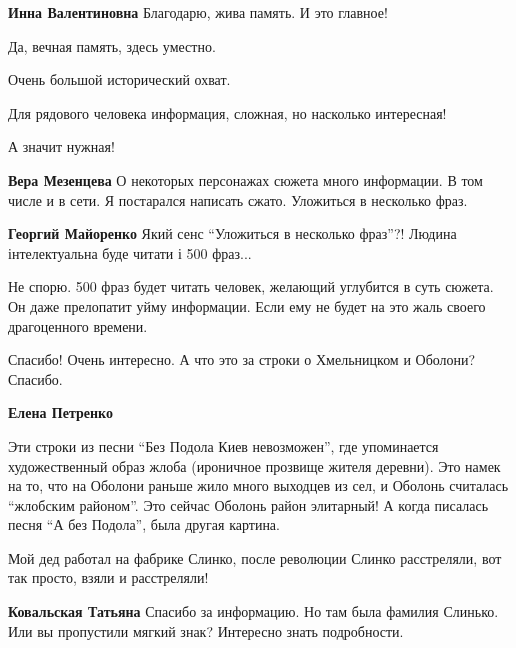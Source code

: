 \begin{itemize}
\textbf{Инна Валентиновна} Благодарю, жива память. И это главное!


Да, вечная память, здесь уместно.

Очень большой исторический охват.

Для рядового человека информация, сложная, но насколько интересная!

А значит нужная!

\begin{itemize} %
\textbf{Вера Мезенцева} О некоторых персонажах сюжета много информации. В том числе и в сети. Я постарался написать сжато. Уложиться в несколько фраз.

\textbf{Георгий Майоренко} Який сенс \enquote{Уложиться в несколько фраз}?! Людина інтелектуальна буде читати і 500 фраз...


Не спорю. 500 фраз будет читать человек, желающий углубится в суть сюжета. Он
даже прелопатит уйму информации. Если ему не будет на это жаль своего
драгоценного времени.

\end{itemize} %

Спасибо! Очень интересно.
А что это за строки о Хмельницком и Оболони?
Спасибо.

\begin{itemize} %
\textbf{Елена Петренко} 

Эти строки из песни \enquote{Без Подола Киев невозможен}, где упоминается
художественный образ жлоба (ироничное прозвище жителя деревни). Это намек на
то, что на Оболони раньше жило много выходцев из сел, и Оболонь считалась
\enquote{жлобским районом}. Это сейчас Оболонь район элитарный! А когда писалась песня
\enquote{А без Подола}, была другая картина.

\end{itemize} %


Мой дед работал на фабрике Слинко, после революции Слинко расстреляли, вот так
просто, взяли и расстреляли!

\begin{itemize} %
\textbf{Ковальская Татьяна} Спасибо за информацию. Но там была фамилия Слинько. Или вы пропустили мягкий знак? Интересно знать подробности.


\end{itemize}
\end{itemize}
